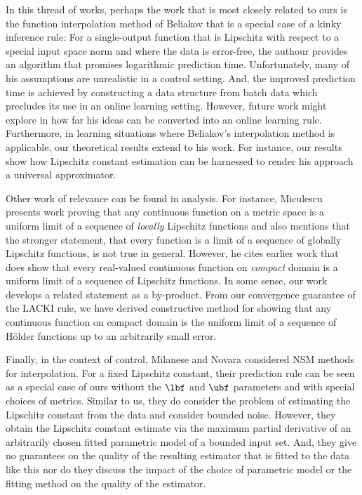 In this thread of works, perhaps the work that is most closely related to ours is the function interpolation method of Beliakov \cite{Beliakov2006} that is a special case of a kinky inference rule: For a single-output function that is Lipschitz with respect to a special input space norm and where the data is error-free, the authour provides an algorithm that promises logarithmic prediction time. Unfortunately, many of his assumptions are unrealistic in a control setting. And, the improved prediction time is achieved by constructing a data structure from batch data which precludes its use in an online learning setting. However, future work might explore in how far his ideas can be 
converted into an online learning rule. Furthermore, in learning situations where Beliakov's interpolation method is applicable, our theoretical results extend to his work. For instance, our results show how Lipschitz constant estimation can be harnessed to render his approach a universal approximator.

Other work of relevance can be found in analysis. For instance, Miculescu \cite{Miculescu2000} presents work proving that any continuous function on a metric space is a uniform limit of a sequence of \emph{locally} Lipschitz functions and also mentions that the stronger statement, that every function is a limit of a sequence of globally Lipschitz functions, is not true in general. However, he cites earlier work \cite{Georganopoulos1967} that does show that every real-valued continuous function on \emph{compact} domain is a uniform limit of a sequence of Lipschitz functions. In some sense, our work develops a related statement as a by-product. 
From our convergence guarantee of the LACKI rule, we have derived constructive method for showing 
that any continuous function on compact domain is the uniform limit of a sequence of H\"older functions up to an arbitrarily small error.

Finally, in the context of control, Milanese and Novara \cite{Milanese2004} considered NSM methods for interpolation. For a fixed Lipschitz constant, their prediction rule can be
seen as a special case of ours without the $\lbf$ and $\ubf$ parameters and with special choices of metrics. Similar to us, they do consider the problem of estimating the Lipschitz constant from the data and consider bounded noise. However, they obtain the Lipschitz constant estimate via the maximum partial derivative of an arbitrarily chosen fitted parametric model of a bounded input set. And, they give no guarantees on the quality of the resulting estimator that is fitted to the data like this nor do they discuss the impact of the choice of parametric model or the fitting method on the quality of the estimator.
 
